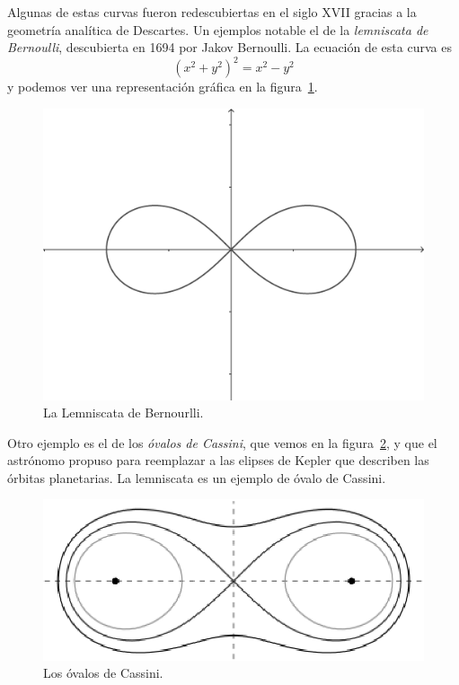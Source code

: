 Algunas de estas curvas fueron redescubiertas en el
siglo XVII gracias a la geometría analítica de Descartes. Un ejemplos notable 
el de la \emph{lemniscata de Bernoulli}, descubierta en 1694 por Jakov Bernoulli. La ecuación 
de esta curva es 
\[
	(x^2+y^2)^2=x^2-y^2
\]
y podemos ver una representación gráfica en la figura~\ref{fig:lemniscata}.

\begin{figure}
   \centering
   \includegraphics[scale=0.2]{images/lemniscata}
   \caption{La Lemniscata de Bernourlli.}
   \label{fig:lemniscata}
\end{figure}
 
Otro ejemplo es el de los \emph{óvalos de Cassini}, que vemos en la
figura~\ref{fig:Cassini}, y que el astrónomo propuso para reemplazar a las
elipses de Kepler que describen las órbitas planetarias. La lemniscata
es un ejemplo de óvalo de Cassini.

\begin{figure}
   \centering
   \includegraphics[scale=0.5]{images/cassini}
   \caption{Los óvalos de Cassini.}
   \label{fig:Cassini}
\end{figure}

